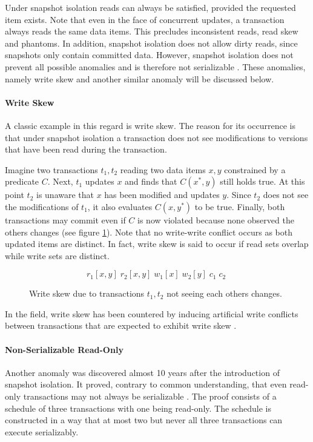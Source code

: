 Under snapshot isolation reads can always be satisfied, provided the requested
item exists. Note that even in the face of concurrent updates, a transaction
always reads the same data items. This precludes inconsistent reads, read skew
and phantoms. In addition, snapshot isolation does not allow dirty reads, since
snapshots only contain committed data. However, snapshot isolation does not
prevent all possible anomalies and is therefore not serializable
\cite{berenson1995critique}. These anomalies, namely write skew and another
similar anomaly will be discussed below.

\paragraph{Write Skew}

A classic example in this regard is write skew. The reason for its occurrence is
that under snapshot isolation a transaction does not see modifications to
versions that have been read during the transaction.

Imagine two transactions $t_1, t_2$ reading two data items $x, y$ constrained by
a predicate $C$. Next, $t_1$ updates $x$ and finds that $C(x^{*}, y)$ still
holds true. At this point $t_2$ is unaware that $x$ has been modified and
updates $y$. Since $t_2$ does not see the modifications of $t_1$, it also
evaluates $C(x, y^{*})$ to be true. Finally, both transactions may commit even
if $C$ is now violated because none observed the others changes (see figure
\ref{fig:write_skew}). Note that no write-write conflict occurs as both updated
items are distinct. In fact, write skew is said to occur if read sets overlap
while write sets are distinct.

\begin{figure}
    \centering
    \[
        r_1[x,y]\; r_2[x,y]\; w_1[x]\; w_2[y]\; c_1\; c_2\;
    \]
    \caption{Write skew due to transactions $t_1, t_2$ not seeing each others changes.}
    \label{fig:write_skew}
\end{figure}

In the field, write skew has been countered by inducing artificial write
conflicts between transactions that are expected to exhibit write skew
\cite{fekete2005making}.

\paragraph{Non-Serializable Read-Only}

Another anomaly was discovered almost 10 years after the introduction of
snapshot isolation. It proved, contrary to common understanding, that even
read-only transactions may not always be serializable \cite{fekete2004read}. The
proof consists of a schedule of three transactions with one being read-only. The
schedule is constructed in a way that at most two but never all three
transactions can execute serializably.

